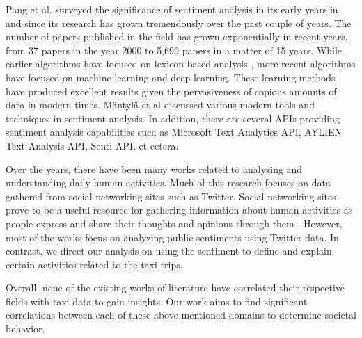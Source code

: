 Pang et al. \cite{bo2008opinion} surveyed the significance of sentiment analysis in its early years in and since its research has grown tremendously over the past couple of years. The number of papers published in the field has grown exponentially in recent years, from 37 papers in the year 2000 to 5,699 papers in a matter of 15 years. While earlier algorithms have focused on lexicon-based analysis \cite{maite2011lexicon}, more recent algorithms have focused on machine learning and deep learning. These learning methods have produced excellent results given the pervasiveness of copious amounts of data in modern times. Mäntylä et al \cite{M_ntyl__2018} discussed various modern tools and techniques in sentiment analysis. In addition, there are several APIs providing sentiment analysis capabilities such as Microsoft Text Analytics API, AYLIEN Text Analysis API, Senti API, et cetera. 


Over the years, there have been many works related to analyzing and understanding daily human activities. Much of this research focuses on data gathered from social networking sites such as Twitter. Social networking sites prove to be a  useful resource for gathering information about human activities as people express and share their thoughts and opinions through them \cite{giachanou2016like}. However, most of the works focus on analyzing public sentiments using Twitter data. In contrast, we direct our analysis on using the sentiment to define and explain certain activities related to the taxi trips.


Overall, none of the existing works of literature have correlated their respective fields with taxi data to gain insights. Our work aims to find significant correlations between each of these above-mentioned domains to determine societal behavior.
